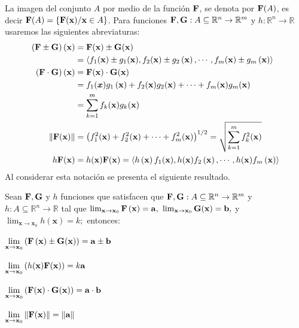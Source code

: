 La imagen del conjunto $A$ por medio de la función $\mathbf{F}$, se denota por $\mathbf{F}(A)$, es decir
$\mathbf{F}(A)=\{\mathbf{F}(\mathbf{x})/\mathbf{x}\in A\}$.
Para funciones $\mathbf{F},\mathbf{G}:A\subseteq \mathbb{R}^n\to \mathbb{R}^m$
y $h:\mathbb{R}^n \to \mathbb{R}$ usaremos las siguientes abreviaturas:
\begin{align*}
  \left( \ve{F}\pm \ve{G}\right) \left( \mathbf{x} \right) &= \ve{F}(\mathbf{x}) \pm \ve{G}(\mathbf{x})\\
  &= \left\langle f_{1}(\mathbf{x}) \pm g_{1}(\mathbf{x}) ,f_{2}(\mathbf{x}) \pm g_{2}\left(
  \mathbf{x}\right) ,\cdots ,f_{m}(\mathbf{x}) \pm g_{m}\left(  \mathbf{x}\right) \right\rangle \\
  \left( \ve{F}\cdot \ve{G}\right) \left( \mathbf{x} \right) &= \ve{F}(\mathbf{x}) \cdot \ve{G}%
  (\mathbf{x}) \\
  &= f_{1}(\bm{x}) g_{1}\left( \mathbf{x}\right) +f_{2}(\mathbf{x}) g_{2}(\mathbf{x})
  +\cdots +f_{m}(\mathbf{x}) g_{m}(\mathbf{x}) \\
  &= \sum_{k=1}^{m}f_{k}(\mathbf{x}) g_{k}(\mathbf{x}) \\
  \left\Vert \ve{F}(\mathbf{x}) \right\Vert &= \left( f_{1}^{2}(\mathbf{x}) +f_{2}^{2}(\mathbf{x}) +\cdots
  +f_{m}^{2}(\mathbf{x}) \right) ^{1/2}=\sqrt{\sum_{k=1}^{m}f_{k}^{2}(\mathbf{x}) }\\
  h\ve{F}(\mathbf{x}) &= h(\mathbf{x}) \ve{F}(\mathbf{x}) =\left\langle h\left( \mathbf{x} \right) f_{1}(\mathbf{x}) ,h(\mathbf{x}) f_{2}\left( \mathbf{x}\right) ,\cdots ,h(\mathbf{x}) f_{m}\left( \mathbf{x}\right) \right\rangle
\end{align*}
Al considerar esta notación se presenta el siguiente resultado.

\begin{teorema}\label{teo1}
  Sean $\mathbf{F},\mathbf{G}$ y $h$ funciones que satisfacen que
  $\mathbf{F},\mathbf{G}:A\subseteq \mathbb{R}^n\to \mathbb{R}^m$ y $h:A\subseteq \mathbb{R}^n\to \mathbb{R}$ tal que
  $\lim_{\mathbf{x\to x}_{0}}\ve{F}\left( \mathbf{x}%
  \right) =\mathbf{a,}$ $\lim_{\mathbf{x\to x}_{0}}\ve{G}%
  (\mathbf{x}) =\mathbf{b,}$ y $\lim_{\mathbf{x\to x}%
  _{0}}h(\mathbf{x}) =k;$ entonces:

  \begin{parrafonumerado}

  \item $\ds \lim_{\mathbf{x\to x}_{0}}\left( \ve{F}\left( \mathbf{x}%
    \right) \pm \ve{G}(\mathbf{x}) \right) =\mathbf{a\pm b}$

  \item $\displaystyle\lim_{\mathbf{x\to x}_{0}}\left( h(\mathbf{x})
    \mathbf{F}(\mathbf{x}) \right) =k\mathbf{a}$

  \item $\displaystyle\lim_{\mathbf{x\to x}_{0}}\left( \mathbf{F}(\mathbf{x}) \cdot \mathbf{G}(\mathbf{x}) \right) =\mathbf{a\cdot b}$

  \item $\displaystyle\lim_{\mathbf{x\to x}_{0}}\left\Vert \mathbf{F}(\mathbf{x}) \right\Vert =\left\Vert \mathbf{a}\right\Vert $
  \end{parrafonumerado}
\end{teorema}

